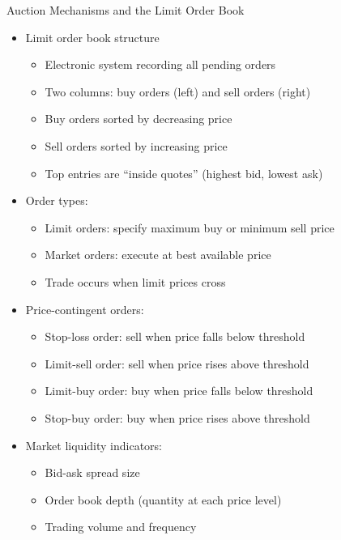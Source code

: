 \documentclass[10pt,handout]{beamer}
\begin{document}
\begin{frame}{Auction Mechanisms and the Limit Order Book}
  \begin{itemize}[<+->]
    \item Limit order book structure
      \begin{itemize}
        \item Electronic system recording all pending orders
        \item Two columns: buy orders (left) and sell orders (right)
        \item Buy orders sorted by decreasing price
        \item Sell orders sorted by increasing price
        \item Top entries are ``inside quotes'' (highest bid, lowest ask)
      \end{itemize}
    \item Order types:
      \begin{itemize}
        \item Limit orders: specify maximum buy or minimum sell price
        \item Market orders: execute at best available price
        \item Trade occurs when limit prices cross
      \end{itemize}
    \item Price-contingent orders:
      \begin{itemize}
        \item Stop-loss order: sell when price falls below threshold
        \item Limit-sell order: sell when price rises above threshold
        \item Limit-buy order: buy when price falls below threshold
        \item Stop-buy order: buy when price rises above threshold
      \end{itemize}
    \item Market liquidity indicators:
      \begin{itemize}
        \item Bid-ask spread size
        \item Order book depth (quantity at each price level)
        \item Trading volume and frequency
      \end{itemize}
  \end{itemize}
\end{frame}
\end{document}
